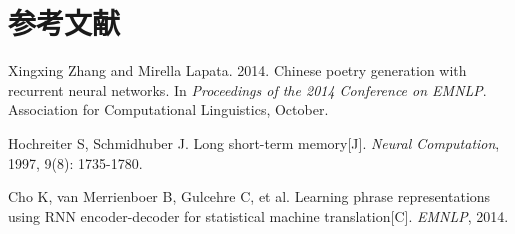 \documentclass[12pt, a4paper]{ctexart}
\begin{document}
\section*{参考文献}

\begin{enumerate}[label={[\arabic*]}]
    \item Xingxing Zhang and Mirella Lapata. 2014. Chinese poetry generation with recurrent neural networks. In \textit{Proceedings of the 2014 Conference on EMNLP}. Association for Computational Linguistics, October.
    \item Hochreiter S, Schmidhuber J. Long short-term memory[J]. \textit{Neural Computation}, 1997, 9(8): 1735-1780.
    \item Cho K, van Merrienboer B, Gulcehre C, et al. Learning phrase representations using RNN encoder-decoder for statistical machine translation[C]. \textit{EMNLP}, 2014.
\end{enumerate}
\end{document}
